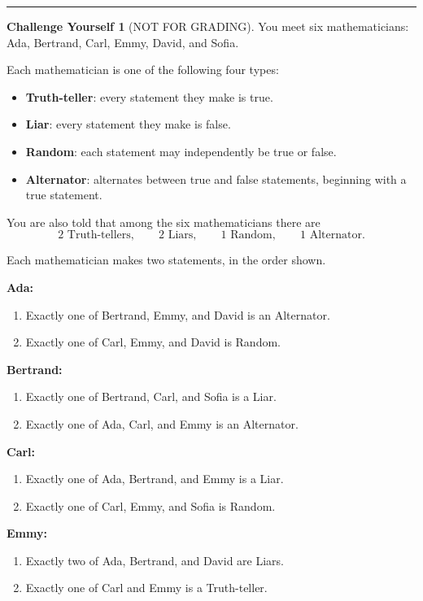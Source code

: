 \documentclass{article}
\theoremstyle{definition}
\newtheorem*{challenge}{Challenge Yourself}
\def\fline{\rule{0.75\linewidth}{0.5pt}}
\newcommand{\finishline}{\begin{center}\fline\end{center}}
\begin{document}
\finishline


\vspace{10pt}

\begin{challenge} [NOT FOR GRADING]

You meet six mathematicians: Ada, Bertrand, Carl, Emmy, David, and Sofia.

Each mathematician is one of the following four types:

\begin{itemize}
    \item \textbf{Truth-teller}: every statement they make is true.
    \item \textbf{Liar}: every statement they make is false.
    \item \textbf{Random}: each statement may independently be true or false.
    \item \textbf{Alternator}: alternates between true and false statements,
    beginning with a true statement.
\end{itemize}

You are also told that among the six mathematicians there are
\[
2 \text{ Truth-tellers}, \qquad
2 \text{ Liars}, \qquad
1 \text{ Random}, \qquad
1 \text{ Alternator}.
\]

Each mathematician makes two statements, in the order shown.

\medskip

\textbf{Ada:}
\begin{enumerate}
    \item Exactly one of Bertrand, Emmy, and David is an Alternator.
    \item Exactly one of Carl, Emmy, and David is Random.
\end{enumerate}

\textbf{Bertrand:}
\begin{enumerate}
    \item Exactly one of Bertrand, Carl, and Sofia is a Liar.
    \item Exactly one of Ada, Carl, and Emmy is an Alternator.
\end{enumerate}

\textbf{Carl:}
\begin{enumerate}
    \item Exactly one of Ada, Bertrand, and Emmy is a Liar.
    \item Exactly one of Carl, Emmy, and Sofia is Random.
\end{enumerate}

\textbf{Emmy:}
\begin{enumerate}
    \item Exactly two of Ada, Bertrand, and David are Liars.
    \item Exactly one of Carl and Emmy is a Truth-teller.
\end{enumerate}


\end{challenge}
\end{document}
